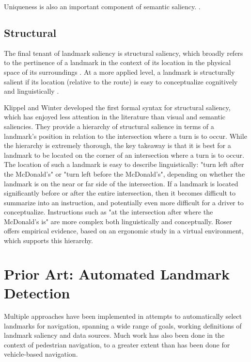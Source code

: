 Uniqueness is also an important component of semantic saliency. \cite{caduff2008assessment}.

\subsection{Structural}
The final tenant of landmark saliency is structural saliency, which broadly refers to the pertinence of a landmark in the context of its location in the physical space of its surroundings \cite{sorrows1999nature}. At a more applied level, a landmark is structurally salient if its location (relative to the route) is easy to conceptualize cognitively and linguistically \cite{klippel2005structural}. 

Klippel and Winter \cite{klippel2005structural} developed the first formal syntax for structural saliency, which has enjoyed less attention in the literature than visual and semantic saliencies. They provide a hierarchy of structural salience in terms of a landmark's position in relation to the intersection where a turn is to occur. While the hierarchy is extremely thorough, the key takeaway is that it is best for a landmark to be located on the corner of an intersection where a turn is to occur. The location of such a landmark is easy to describe linguistically: "turn left after the McDonald's" or "turn left before the McDonald's", depending on whether the landmark is on the near or far side of the intersection. If a landmark is located significantly before or after the entire intersection, then it becomes difficult to summarize into an instruction, and potentially even more difficult for a driver to conceptualize. Instructions such as "at the intersection after where the McDonald's is" are more complex both linguistically and conceptually. Roser \cite{roser2012structural} offers empirical evidence, based on an ergonomic study in a virtual environment, which supports this hierarchy.

\section{Prior Art: Automated Landmark Detection}\label{Sect:eqns}
Multiple approaches have been implemented in attempts to automatically select landmarks for navigation, spanning a wide range of goals, working definitions of landmark saliency and data sources. Much work has also been done in the context of pedestrian navigation, to a greater extent than has been done for vehicle-based navigation.

